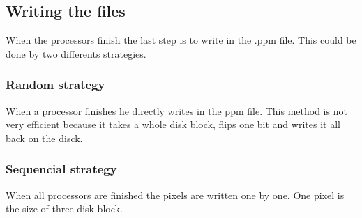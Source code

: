 \subsection{Writing the files}
When the processors finish the last step is to write in the .ppm file. This could be done by two differents strategies.

\subsubsection{Random strategy}
When a processor finishes he directly writes in the ppm file. This method is not very efficient because it takes a whole disk block, flips one bit and writes it all back on the disck.

\subsubsection{Sequencial strategy}
When all processors are finished the pixels are written one by one. One pixel is the size of three disk block.